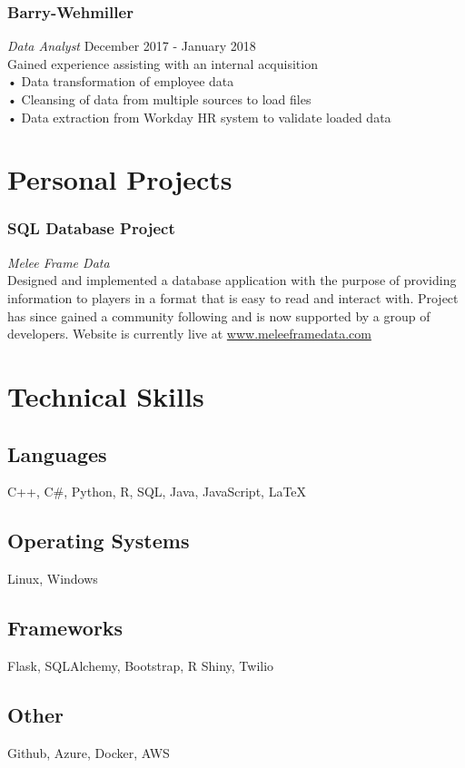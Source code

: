 \documentclass[11pt]{article}
\begin{document}
\subsubsection{Barry-Wehmiller}
\hspace{.2in} \textit{Data Analyst} \hspace*{\fill} December 2017 - January 2018 \\
Gained experience assisting with an internal acquisition \\
• Data transformation of employee data \\
• Cleansing of data from multiple sources to load files \\
• Data extraction from Workday HR system to validate loaded data 


\section{Personal Projects}

\subsubsection{SQL Database Project} 
\hspace{.2in} \textit{Melee Frame Data} \\
Designed and implemented a database application with the purpose of providing information
to players in a format that is easy to read and interact with. Project has since gained a community following and is now supported by a group of developers. Website is currently live at \url{www.meleeframedata.com}


\section{Technical Skills}

\subsection{Languages}
C++, C\#, Python, R, SQL, Java, JavaScript, {\LaTeX}

\subsection{Operating Systems}
Linux, Windows

\subsection{Frameworks}
Flask, SQLAlchemy, Bootstrap, R Shiny, Twilio

\subsection{Other}
Github, Azure, Docker, AWS
\end{document}
